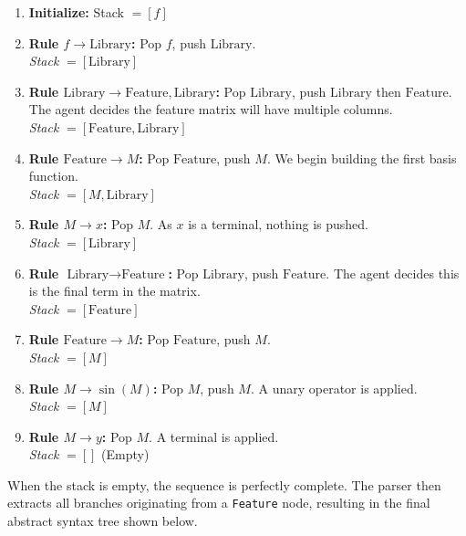\documentclass[11pt,a4paper]{article}
\begin{document}
\begin{enumerate}
    \item \textbf{Initialize:} Stack $= [f]$
    \item \textbf{Rule $f \rightarrow \text{Library}$:} Pop $f$, push $\text{Library}$.\\
          \textit{Stack} $= [\text{Library}]$
    \item \textbf{Rule $\text{Library} \rightarrow \text{Feature}, \text{Library}$:} Pop $\text{Library}$, push $\text{Library}$ then $\text{Feature}$. The agent decides the feature matrix will have multiple columns.\\
          \textit{Stack} $= [\text{Feature}, \text{Library}]$
    \item \textbf{Rule $\text{Feature} \rightarrow M$:} Pop $\text{Feature}$, push $M$. We begin building the first basis function.\\
          \textit{Stack} $= [M, \text{Library}]$
    \item \textbf{Rule $M \rightarrow x$:} Pop $M$. As $x$ is a terminal, nothing is pushed.\\
          \textit{Stack} $= [\text{Library}]$
    \item \textbf{Rule $\text{Library} \rightarrow \text{Feature}$:} Pop $\text{Library}$, push $\text{Feature}$. The agent decides this is the final term in the matrix.\\
          \textit{Stack} $= [\text{Feature}]$
    \item \textbf{Rule $\text{Feature} \rightarrow M$:} Pop $\text{Feature}$, push $M$.\\
          \textit{Stack} $= [M]$
    \item \textbf{Rule $M \rightarrow \sin(M)$:} Pop $M$, push $M$. A unary operator is applied.\\
          \textit{Stack} $= [M]$
    \item \textbf{Rule $M \rightarrow y$:} Pop $M$. A terminal is applied.\\
          \textit{Stack} $= []$ (Empty)
\end{enumerate}

When the stack is empty, the sequence is perfectly complete. The parser then extracts all branches originating from a \texttt{Feature} node, resulting in the final abstract syntax tree shown below.
\end{document}
